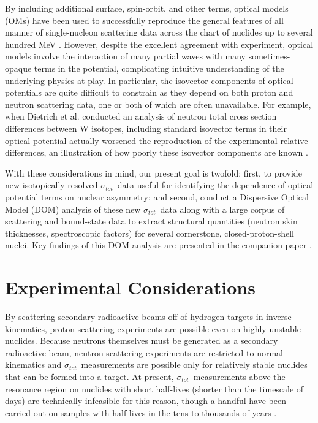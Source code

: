 \documentclass[twocolumn,secnumarabic,amssymb, nobibnotes, aps, prl,
superscriptaddress, nobalancelastpage]{revtex4}
\newcommand{\tot}{\ensuremath{\sigma_{tot}}}
\begin{document}
By including additional surface, spin-orbit, and other terms, optical models (OMs) have been 
used to successfully reproduce the general features of all manner of single-nucleon scattering 
data across the chart of nuclides up to several hundred MeV \cite{Perey1976,
CH89, KoningDelaroche}. However, despite the excellent agreement with experiment, optical models
involve the interaction of many partial waves with many sometimes-opaque terms
in the potential, complicating intuitive understanding of the underlying
physics at play. In particular, the isovector components of optical potentials
are quite difficult to constrain as they depend on both proton and neutron 
scattering data, one or both of which are often unavailable. For example,
when Dietrich et al. conducted an analysis of neutron total cross section
differences between W isotopes, including standard isovector terms in their
optical potential actually worsened the reproduction of the experimental
relative differences, an
illustration of how poorly these isovector components are known \cite{Dietrich2003}.

With these considerations in mind, our present goal is twofold: first, to
provide new isotopically-resolved \tot\ data useful for identifying the 
dependence of optical 
potential terms on nuclear asymmetry; and second, conduct a Dispersive Optical Model
(DOM) analysis of these new \tot\ data along with a large corpus of scattering
and bound-state data to extract structural quantities (neutron skin
thicknesses, spectroscopic factors) for several cornerstone, closed-proton-shell nuclei.
Key findings of this DOM analysis are presented in the companion paper \cite{Pruitt2020PRL}.

\section{Experimental Considerations}
By scattering secondary radioactive beams off of hydrogen targets in inverse
kinematics, proton-scattering experiments are possible even on highly unstable
nuclides. Because neutrons themselves must be generated as a
secondary radioactive beam, neutron-scattering experiments are restricted to
normal kinematics and \tot\ measurements are possible only for relatively stable
nuclides that can be formed into a target. At present, \tot\ measurements above
the resonance region on nuclides with short half-lives (shorter than the timescale of
days) are technically infeasible for this reason, though a handful have been carried out on
samples with half-lives in the tens to thousands of years \cite{Poenitz1983,
Phillips1980, Foster1971}.
\end{document}
